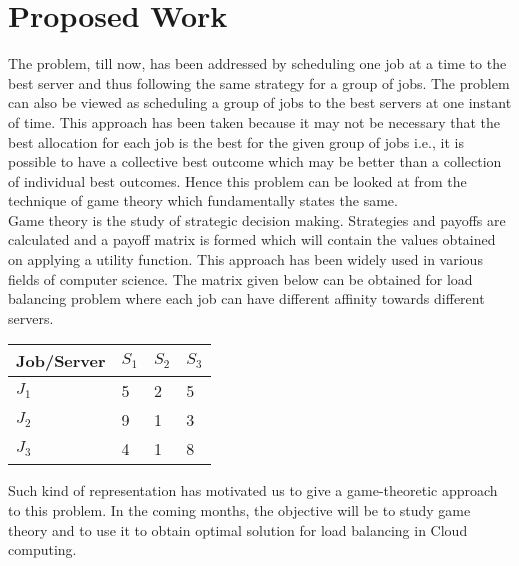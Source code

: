 \chapter{Proposed Work}
The problem, till now, has been addressed by scheduling one job at a time to the best server and thus following the same strategy for a group of jobs. The problem can also be viewed as scheduling a group of jobs to the best servers at one instant of time. This approach has been taken because it may not be necessary that the best allocation for each job is the best for the given group of jobs i.e., it is possible to have a collective best outcome which may be better than a collection of individual best outcomes. Hence this problem can be looked at from the technique of game theory which fundamentally states the same.\\[0.2cm]
Game theory is the study of strategic decision making. Strategies and payoffs are calculated and a payoff matrix is formed which will contain the values obtained on applying a utility function. This approach has been widely used in various fields of computer science. The matrix given below can be obtained for load balancing problem where each job can have different affinity towards different servers.
\begin{center}
    \begin{tabular}{ | l | l | l | l |}
    \hline
    \small {Job/Server} & $S_1$ & $S_2$ & $S_3$\\ \hline
    $J_1$ & 5 & 2 & 5\\ \hline
    $J_2$ & 9 & 1 & 3\\ \hline
    $J_3$ & 4 & 1 & 8\\ \hline
    \end{tabular}
\end{center}
Such kind of representation has motivated us to give a game-theoretic approach to this problem. In the coming months, the objective will be to study game theory and to use it to obtain optimal solution for load balancing in Cloud computing.


